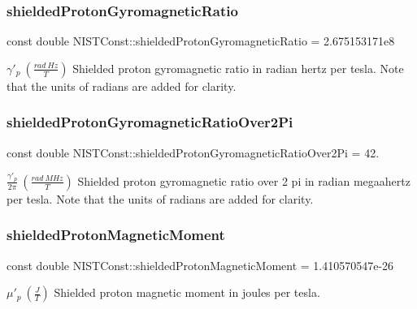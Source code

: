 \subsubsection{\texorpdfstring{shielded\+Proton\+Gyromagnetic\+Ratio}{shieldedProtonGyromagneticRatio}}
{\footnotesize\ttfamily const double N\+I\+S\+T\+Const\+::shielded\+Proton\+Gyromagnetic\+Ratio = 2.\+675153171e8}

$\gamma'_p \ (\frac{rad\ Hz}{T})$ Shielded proton gyromagnetic ratio in radian hertz per tesla. Note that the units of radians are added for clarity. \mbox{\label{group___n_i_s_t_const-_proton_ga5b2d223ede8fc141af04cef0486c2c52}} 
\subsubsection{\texorpdfstring{shielded\+Proton\+Gyromagnetic\+Ratio\+Over2\+Pi}{shieldedProtonGyromagneticRatioOver2Pi}}
{\footnotesize\ttfamily const double N\+I\+S\+T\+Const\+::shielded\+Proton\+Gyromagnetic\+Ratio\+Over2\+Pi = 42.}

$\frac{\gamma'_p}{2 \pi} \ (\frac{rad\ MHz}{T})$ Shielded proton gyromagnetic ratio over 2 pi in radian megaahertz per tesla. Note that the units of radians are added for clarity. \mbox{\label{group___n_i_s_t_const-_proton_ga3e2c09881642d47d3e869c7803862e6f}} 
\subsubsection{\texorpdfstring{shielded\+Proton\+Magnetic\+Moment}{shieldedProtonMagneticMoment}}
{\footnotesize\ttfamily const double N\+I\+S\+T\+Const\+::shielded\+Proton\+Magnetic\+Moment = 1.\+410570547e-\/26}

$\mu'_p \ (\frac{J}{T})$ Shielded proton magnetic moment in joules per tesla. \mbox{\label{group___n_i_s_t_const-_proton_ga175eb518370bc31471e8ad763e760b72}} 
